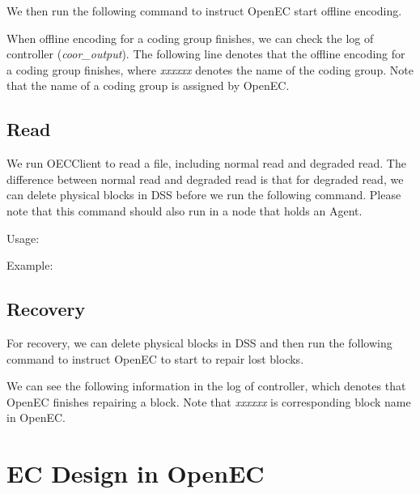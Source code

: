 \documentclass[letterpaper,12pt]{article}
\newcommand{\openec}{{\sf\small OpenEC}\xspace}
\begin{document}
We then run the following command to instruct \openec start offline encoding.

\begin{center}
\noindent{}
\end{center}

When offline encoding for a coding group finishes, we can check the log of controller ({\sl coor\_output}).
The following line denotes that the offline encoding for a coding group finishes, where {\sl xxxxxx} denotes
the name of the coding group. Note that the name of a coding group is assigned by \openec.

\begin{center}
\noindent{}
\end{center}


\subsection{Read}

We run OECClient to read a file, including normal read and degraded read. 
The difference between normal read and degraded read is that for degraded read, we
can delete physical blocks in DSS before we run the following command.
Please note that this command should also run in a node that holds an Agent.

Usage:
\begin{center}
\noindent{}
\end{center}

Example:
\begin{center}
\noindent{}
\end{center}

\subsection{Recovery}

For recovery, we can delete physical blocks in DSS and then run the following command to instruct \openec 
to start to repair lost blocks.

\begin{center}
\noindent{}
\end{center}

We can see the following information in the log of controller, which denotes that \openec finishes repairing a block.
Note that {\sl xxxxxx} is corresponding block name in \openec.

\begin{center}
\noindent{}
\end{center}

\section{EC Design in OpenEC}
\end{document}
